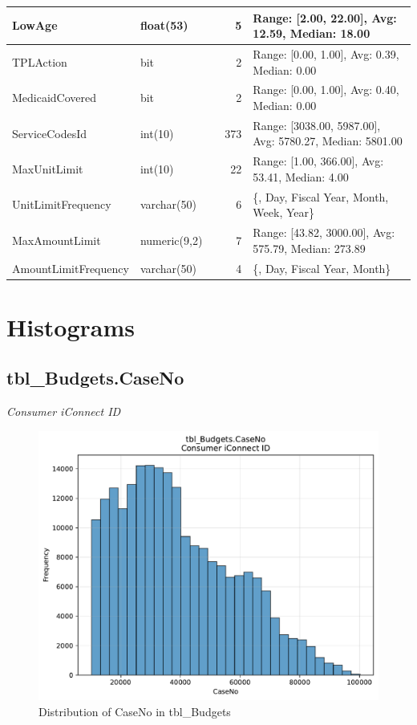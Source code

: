 \begin{landscape}
\begin{longtable}{|l|l|l|r|p{6cm}|}
\hline
LowAge & float(53) &  & 5 & Range: [2.00, 22.00], Avg: 12.59, Median: 18.00 \\
\hline
TPLAction & bit &  & 2 & Range: [0.00, 1.00], Avg: 0.39, Median: 0.00 \\
\hline
MedicaidCovered & bit &  & 2 & Range: [0.00, 1.00], Avg: 0.40, Median: 0.00 \\
\hline
ServiceCodesId & int(10) &  & 373 & Range: [3038.00, 5987.00], Avg: 5780.27, Median: 5801.00 \\
\hline
MaxUnitLimit & int(10) &  & 22 & Range: [1.00, 366.00], Avg: 53.41, Median: 4.00 \\
\hline
UnitLimitFrequency & varchar(50) &  & 6 & \{, Day, Fiscal Year, Month, Week, Year\} \\
\hline
MaxAmountLimit & numeric(9,2) &  & 7 & Range: [43.82, 3000.00], Avg: 575.79, Median: 273.89 \\
\hline
AmountLimitFrequency & varchar(50) &  & 4 & \{, Day, Fiscal Year, Month\} \\
\hline
\end{longtable}

\end{landscape}


\newpage \section{Histograms}

\subsection{tbl\_Budgets.CaseNo}
\textit{Consumer iConnect ID}

\begin{figure}[htbp]
\centering
\includegraphics[width=\textwidth]{figures/dbo_tbl_Budgets_CaseNo.pdf}
\caption{Distribution of CaseNo in tbl\_Budgets}
\end{figure}\newpage

